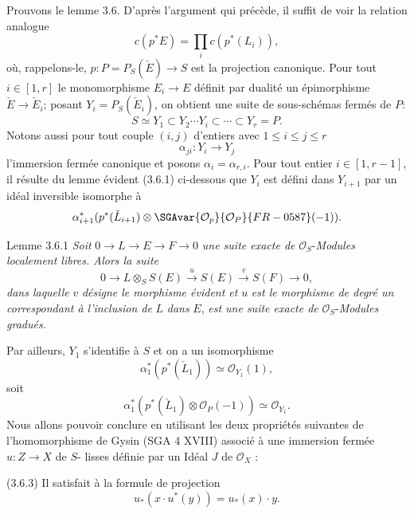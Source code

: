 Prouvons le lemme 3.6. D'après l'argument qui précède, il suffit de voir la relation analogue
\[
c(p^*E)=\prod_i c(p^*(L_i)),
\]
où, rappelons-le, $p:P=P_S(\check E)\to S$ est la projection canonique. Pour tout $i\in[1,r]$ le monomorphisme $E_i\to E$ définit par dualité un épimorphisme $\check E\to\check E_i$; posant $Y_i=P_S(\check E_i)$, on obtient une suite de sous-schémas fermés de $P$:
\[
S\simeq Y_1\subset Y_2\cdots Y_i\subset\cdots\subset Y_r=P.
\]
Notons aussi pour tout couple $(i,j)$ d'entiers avec $1\le i\le j\le r$
\[
\alpha_{ji}:Y_i\to Y_j
\]
l'immersion fermée canonique et posons $\alpha_i=\alpha_{r,i}$. Pour tout entier $i\in[1,r-1]$, il résulte du lemme évident (3.6.1) ci-dessous que $Y_i$ est défini dans $Y_{i+1}$ par un idéal inversible isomorphe à
\[
\alpha_{i+1}^*(p^*(\check L_{i+1})\otimes\SGAvar{\mathcal{O}_p}{\mathcal{O}_P}{FR-0587}(-1)).
\]

\begin{statement}{Lemme 3.6.1}
\emph{Soit} $0\to L\to E\to F\to0$ \emph{une suite exacte de} $\mathcal{O}_S$-\emph{Modules localement libres. Alors la suite}
\[
0\to L\otimes_S S(E)\xrightarrow{u}S(E)\xrightarrow{v}S(F)\to0,
\]
\emph{dans laquelle} $v$ \emph{désigne le morphisme évident et} $u$ \emph{est le morphisme de degré un correspondant à l'inclusion de} $L$ \emph{dans} $E$, \emph{est une suite exacte de} $\mathcal{O}_S$-\emph{Modules gradués}.
\end{statement}

Par
ailleurs, $Y_1$ s'identifie à $S$ et on a un isomorphisme
\[
\alpha_1^*(p^*(\check L_1))\simeq\mathcal{O}_{Y_1}(1),
\]
soit
\[
\alpha_1^*(p^*(\check L_1)\otimes\mathcal{O}_P(-1))\simeq \mathcal{O}_{Y_1}.
\tag{3.6.2.}
\]
Nous allons pouvoir conclure en utilisant les deux propriétés suivantes de l'homomorphisme de Gysin (SGA 4 XVIII) associé à une immersion fermée $u:Z\to X$ de $S$- lisses définie par un Idéal $J$ de $\mathcal{O}_X$ :

(3.6.3) Il satisfait à la formule de projection
\[
u_*(x\cdot u^*(y))=u_*(x)\cdot y.
\]

